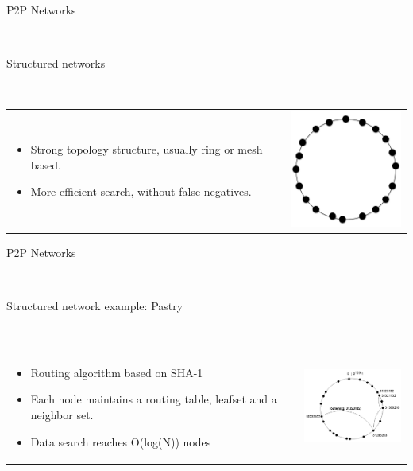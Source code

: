 \documentclass[12pt]{beamer}
\renewcommand{\frametitle}[1]{\vspace{0.2cm}\begin{huge}#1\end{huge}\\}
\renewcommand{\framesubtitle}[1]{\vspace{0.4cm} \hspace{0.4cm}\begin{large}#1\end{large}\\}
\begin{document}
    \begin{frame}
    \frametitle{P2P Networks}
    \framesubtitle{Structured networks}
    \begin{table}
    \begin{tabular}{p{7cm}p{3cm}}
    \begin{itemize}
        \item Strong topology structure, usually ring or mesh based.
        \item More efficient search, without false negatives.
    \end{itemize}
    &
    \vspace{1.5cm}
    \includegraphics[width=4cm]{../../presentacion/img/p2p-structured}\\
    \end{tabular}
    \end{table}
    \end{frame}

    \begin{frame}
    \frametitle{P2P Networks}
    \framesubtitle{Structured network example: Pastry}
    \begin{table}
    \begin{tabular}{p{6cm}p{4cm}}
    \begin{itemize}
        \item Routing algorithm based on SHA-1
        \item Each node maintains a routing table, leafset and a neighbor set.
        \item Data search reaches O(log(N)) nodes
    \end{itemize}
    &
    \vspace{0.5cm}
    \includegraphics[width=4cm]{../../img/pastryrouting}\\
    \end{tabular}
    \end{table}
    \end{frame}
\end{document}
